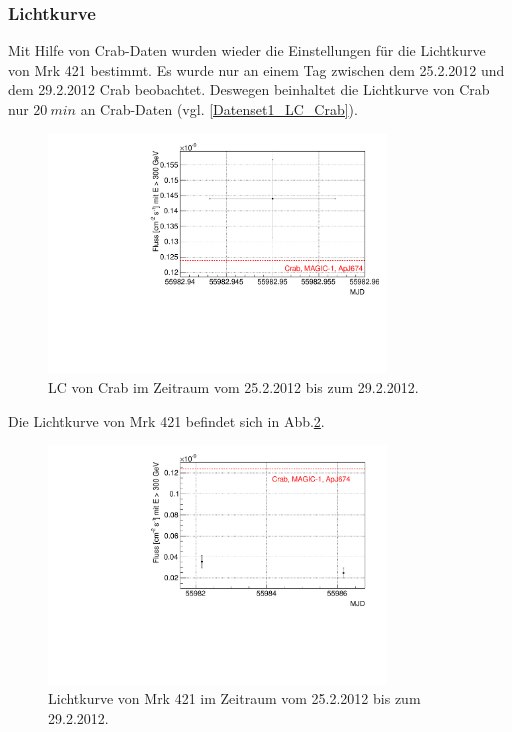 \subsubsection{Lichtkurve}
Mit Hilfe von Crab-Daten wurden wieder die Einstellungen für die Lichtkurve von Mrk 421 bestimmt.
Es wurde nur an einem Tag zwischen dem 25.2.2012 und dem 29.2.2012 Crab beobachtet.
Deswegen beinhaltet die Lichtkurve von Crab nur $\SI{20}{min}$ an Crab-Daten (vgl. \autoref{Datenset1_LC_Crab}).

\begin{figure}
    \centering
    \includegraphics[width=0.8\textwidth]{./Plots/04_MrkAnalyse/Datenset1/Datenset1_LC_Crab.pdf}
    \caption{LC von Crab im Zeitraum vom 25.2.2012 bis zum 29.2.2012.}
    \label{Datenset1_LC_Crab}
\end{figure}

Die Lichtkurve von Mrk 421 befindet sich in Abb.\ref{Datenset1_LC_Mrk421}.

\begin{figure}
    \centering
    \includegraphics[width=0.8\textwidth]{./Plots/04_MrkAnalyse/Datenset1/Datenset1_LC_Mrk421.pdf}
    \caption{Lichtkurve von Mrk 421 im Zeitraum vom 25.2.2012 bis zum 29.2.2012.}
    \label{Datenset1_LC_Mrk421}
\end{figure}

